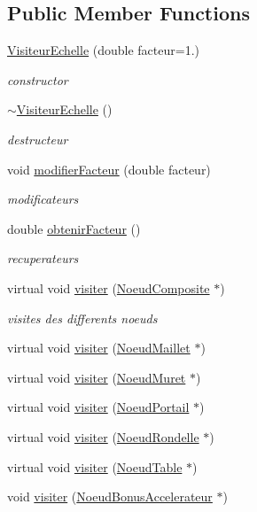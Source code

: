 \subsection*{Public Member Functions}
\begin{DoxyCompactItemize}
\item 
\hyperlink{group__inf2990_gaddf0654645ae3598073fb8ec209c62ff}{Visiteur\+Echelle} (double facteur=1.)
\begin{DoxyCompactList}\small\item\em constructor \end{DoxyCompactList}\item 
\hyperlink{group__inf2990_gaefd75264dd515e96588720d78698cb43}{$\sim$\+Visiteur\+Echelle} ()
\begin{DoxyCompactList}\small\item\em destructeur \end{DoxyCompactList}\item 
void \hyperlink{group__inf2990_ga499407dd8991f64b30fc120017ab4090}{modifier\+Facteur} (double facteur)
\begin{DoxyCompactList}\small\item\em modificateurs \end{DoxyCompactList}\item 
double \hyperlink{group__inf2990_gae9b1f432611d822d61c595eaff646009}{obtenir\+Facteur} ()
\begin{DoxyCompactList}\small\item\em recuperateurs \end{DoxyCompactList}\item 
virtual void \hyperlink{group__inf2990_ga0e77c9cf588d5361ec7eccfc9106ce6d}{visiter} (\hyperlink{class_noeud_composite}{Noeud\+Composite} $\ast$)
\begin{DoxyCompactList}\small\item\em visites des differents noeuds \end{DoxyCompactList}\item 
virtual void \hyperlink{group__inf2990_ga5cde1fb2bc7754fb7f9ce9943deafbc2}{visiter} (\hyperlink{class_noeud_maillet}{Noeud\+Maillet} $\ast$)
\item 
virtual void \hyperlink{group__inf2990_ga66c3727bc8cb483ce19c66a933a1e171}{visiter} (\hyperlink{class_noeud_muret}{Noeud\+Muret} $\ast$)
\item 
virtual void \hyperlink{group__inf2990_gab0abc0f847cb7abda9f002229e88829f}{visiter} (\hyperlink{class_noeud_portail}{Noeud\+Portail} $\ast$)
\item 
virtual void \hyperlink{group__inf2990_gadb69bccd2cfe72d73f860e3a4eabee7d}{visiter} (\hyperlink{class_noeud_rondelle}{Noeud\+Rondelle} $\ast$)
\item 
virtual void \hyperlink{group__inf2990_ga727e8d9127b63b580d4d3297a79332f1}{visiter} (\hyperlink{class_noeud_table}{Noeud\+Table} $\ast$)
\item 
void \hyperlink{group__inf2990_ga397e6d637137fcb2c094190329b2d35b}{visiter} (\hyperlink{class_noeud_bonus_accelerateur}{Noeud\+Bonus\+Accelerateur} $\ast$)
\end{DoxyCompactItemize}
